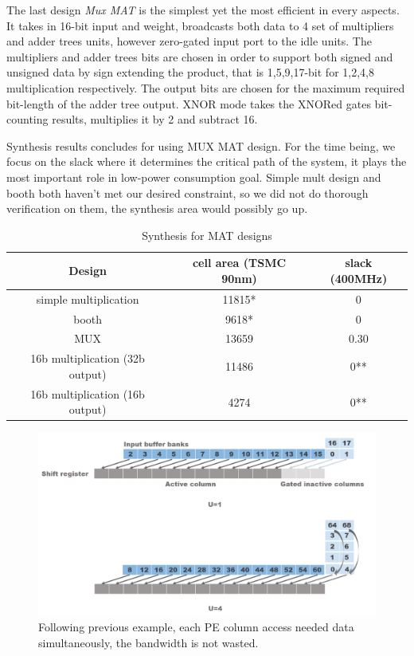 The last design \textit{Mux MAT} is the simplest yet the most efficient in every aspects. It takes in 16-bit input and weight, broadcasts both data to 4 set of multipliers and adder trees units, however zero-gated input port to the idle units. The multipliers and adder trees bits are chosen in order to support both signed and unsigned data by sign extending the product, that is 1,5,9,17-bit for 1,2,4,8 multiplication respectively. The output bits are chosen for the maximum required bit-length of the adder tree output. XNOR mode takes the XNORed gates bit-counting results, multiplies it by 2 and subtract 16. 

Synthesis results concludes for using MUX MAT design. For the time being, we focus on the slack where it determines the critical path of the system, it plays the most important role in low-power consumption goal. Simple mult design and booth both haven't met our desired constraint, so we did not do thorough verification on them, the synthesis area would possibly go up. 
\begin{table}
    \caption{Synthesis for MAT designs}
    \label{tab:pad_cons}
    \centering
    \footnotesize 
        \begin{tabular}{c|cc}
        \toprule
        Design &  cell area (TSMC 90nm) & slack (400MHz)\\
        \midrule
        simple multiplication & 11815* \footnotemark & 0\\
        booth & 9618* & 0\\
        MUX & 13659 & 0.30\\
        16b multiplication (32b output) & 11486 & 0**\\
        16b multiplication (16b output) & 4274 & 0**\footnotemark\\
        \bottomrule
        \end{tabular}

\end{table}
\begin{figure}[h]
    \centering
    \includegraphics[width=1\linewidth]{inc/4_proposed_architecture/figure/shift.png}
    \caption{Following previous example, each PE column access needed data simultaneously, the bandwidth is not wasted.}
    \label{fig:shift_dispatcher}
\end{figure}
